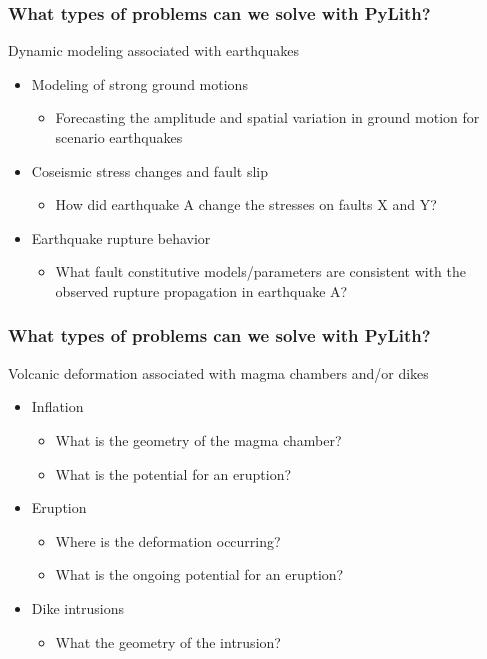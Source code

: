 \documentclass{beamer}
\begin{document}
\begin{frame}
  \frametitle{What types of problems can we solve with PyLith?}

  \vfill
  Dynamic modeling associated with earthquakes
  \vfill

  \begin{itemize}
  \item Modeling of strong ground motions
    \begin{itemize}
    \item Forecasting the amplitude and spatial variation in ground
      motion for scenario earthquakes
    \end{itemize}
  \item Coseismic stress changes and fault slip
    \begin{itemize}
    \item How did earthquake A change the stresses on faults X and Y?
    \end{itemize}
  \item Earthquake rupture behavior
    \begin{itemize}
    \item What fault constitutive models/parameters are consistent
      with the observed rupture propagation in earthquake A?
    \end{itemize}
  \end{itemize}
  \vfill

\end{frame}


\begin{frame}
  \frametitle{What types of problems can we solve with PyLith?}

  \vfill
  Volcanic deformation associated with magma chambers and/or dikes
  \begin{itemize}
  \item Inflation
    \begin{itemize}
    \item What is the geometry of the magma chamber?
    \item What is the potential for an eruption?
    \end{itemize}
  \item Eruption
    \begin{itemize}
    \item Where is the deformation occurring?
    \item What is the ongoing potential for an eruption?
    \end{itemize}
  \item Dike intrusions
    \begin{itemize}
    \item What the geometry of the intrusion?
    \end{itemize}
  \end{itemize}
  \vfill

\end{frame}
\end{document}
